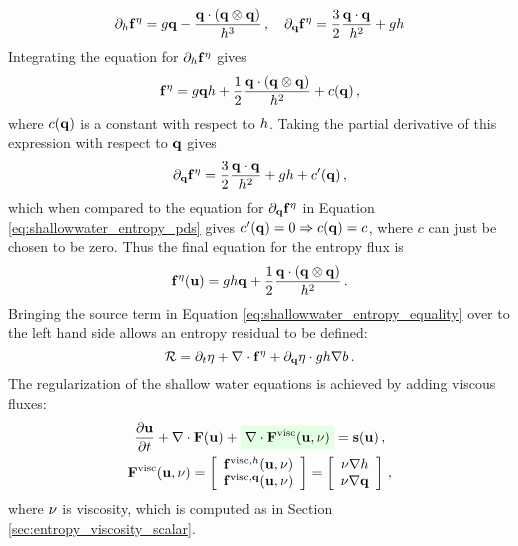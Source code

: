 \begin{equation}\label{eq:shallowwater_entropy_pds}
  \partial_h\mathbf{f}^\eta
  = g\mathbf{q}
  - \frac{\mathbf{q}\cdot\left(\mathbf{q}\otimes\mathbf{q}\right)} 
  {h^3}
  \,,\quad
  \partial_{\mathbf{q}}\mathbf{f}^\eta
  = \frac{3}{2}\frac{\mathbf{q}\cdot\mathbf{q}}{h^2}
  + gh
\end{equation}
Integrating the equation for $\partial_h\mathbf{f}^\eta$
gives
\[
  \mathbf{f}^\eta
  = g\mathbf{q}h
  + \frac{1}{2}\frac{\mathbf{q}\cdot\left(\mathbf{q}\otimes\mathbf{q}\right)} 
  {h^2}
  + c(\mathbf{q}) \,,
\]
where $c(\mathbf{q})$ is a constant with respect to $h$. Taking
the partial derivative of this expression with respect to $\mathbf{q}$
gives
\[
  \partial_{\mathbf{q}}\mathbf{f}^\eta
  = \frac{3}{2}\frac{\mathbf{q}\cdot\mathbf{q}}{h^2}
  + gh + c'(\mathbf{q}) \,,
\]
which when compared to the equation for 
$\partial_{\mathbf{q}}\mathbf{f}^\eta$ in Equation
\eqref{eq:shallowwater_entropy_pds} gives
$c'(\mathbf{q})=0\Rightarrow c(\mathbf{q})=c$, where
$c$ can just be chosen to be zero. Thus the final equation for the
entropy flux is
\begin{equation}
  \mathbf{f}^\eta(\mathbf{u})
  = gh\mathbf{q}
  + \frac{1}{2}\frac{\mathbf{q}\cdot\left(\mathbf{q}\otimes\mathbf{q}\right)} 
  {h^2}
  \,.
\end{equation}
Bringing the source term in Equation \eqref{eq:shallowwater_entropy_equality}
over to the left hand side allows an entropy residual to be defined:
\begin{equation}
  \mathcal{R} = \partial_t\eta
  + \nabla\cdot\mathbf{f}^\eta
  + \partial_{\mathbf{q}}\eta\cdot gh\nabla b
  \,.
\end{equation}
The regularization of the shallow water equations is achieved by adding
viscous fluxes:
\begin{equation}
\begin{gathered}
  \ppt{\vectorsolution} + \nabla\cdot\consfluxvector
  + \highlightgreen{\nabla\cdot\viscconsfluxvector}
  = \conssource \eqc
\\
  \viscconsfluxvector
  = \left[\begin{array}{c}
    \viscflux{\height}(\vectorsolution,\viscosity)\\
    \viscflux{\heightmomentum}(\vectorsolution,\viscosity)
    \end{array}\right]
  = \left[\begin{array}{c}
    \viscosity\nabla\height\\
    \viscosity\nabla\heightmomentum
    \end{array}\right] \eqc
\end{gathered}
\end{equation}
where $\nu$ is viscosity, which is computed as in Section
\ref{sec:entropy_viscosity_scalar}.
